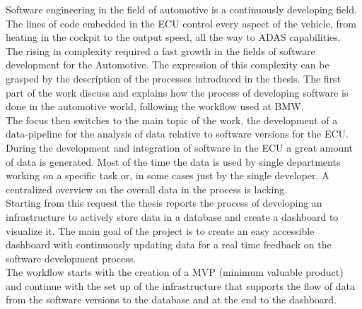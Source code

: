 \documentclass[../main.tex]{subfiles}
\begin{document}
Software engineering in the field of automotive is a continuously developing field. The lines of code embedded in the \gls{ECU} control every aspect of the vehicle, from heating in the cockpit to the output speed, all the way to \gls{ADAS} capabilities.\\
The rising in complexity required a fast growth in the fields of software development for the Automotive. The expression of this complexity can be grasped by the description of the processes introduced in the thesis. The first part of the work discuss and explains how the process of developing software is done in the automotive world, following the workflow used at \gls{BMW}.\\
The focus then switches to the main topic of the work, the development of a data-pipeline for the analysis of data relative to software versions for the \gls{ECU}. During the development and integration of software in the \gls{ECU} a great amount of data is generated. Most of the time the data is used by single departments working on a specific task or, in some cases just by the single developer. A centralized overview on the overall data in the process is lacking.\\
Starting from this request the thesis reports the process of developing an infrastructure to actively store data in a database and create a dashboard to visualize it. The main goal of the project is to create an easy accessible dashboard with continuously updating data for a real time feedback on the software development process.\\
The workflow starts with the creation of a MVP (minimum valuable product) and continue with the set up of the infrastructure that supports the flow of data from the software versions to the database and at the end to the dashboard.\\

\cleardoublepage
\end{document}
